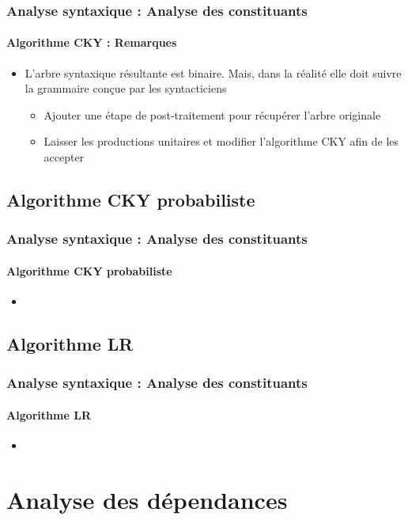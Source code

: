 \documentclass[xcolor=table]{beamer}
\begin{document}
\begin{frame}
\frametitle{Analyse syntaxique : Analyse des constituants}
\framesubtitle{Algorithme CKY : Remarques}

\begin{itemize}
	\item L'arbre syntaxique résultante est binaire. Mais, dans la réalité elle doit suivre la grammaire conçue par les syntacticiens
	\begin{itemize}
		\item Ajouter une étape de post-traitement pour récupérer l'arbre originale
		\item Laisser les productions unitaires et modifier l'algorithme CKY afin de les accepter
	\end{itemize}
\end{itemize}

\end{frame}

\subsection{Algorithme CKY probabiliste}

\begin{frame}
\frametitle{Analyse syntaxique : Analyse des constituants}
\framesubtitle{Algorithme CKY probabiliste}

\begin{itemize}
	\item 
\end{itemize}

\end{frame}

\subsection{Algorithme LR}

\begin{frame}
\frametitle{Analyse syntaxique : Analyse des constituants}
\framesubtitle{Algorithme LR}

\begin{itemize}
	\item 
\end{itemize}

\end{frame}

\section{Analyse des dépendances}
\end{document}
